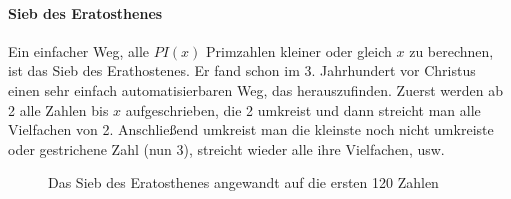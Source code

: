 \begin{refsegment}
\paragraph*{Sieb des Eratosthenes}\mbox{}
\hypertarget{SieveEratosthenes01}{}

Ein einfacher Weg, alle $PI(x)$ Primzahlen kleiner oder gleich $x$
zu berechnen, ist das Sieb des Erathostenes. Er fand schon im 3.
Jahrhundert vor Christus einen sehr einfach automatisierbaren Weg,
das herauszufinden. Zuerst werden ab 2 alle Zahlen bis $x$
aufgeschrieben, die 2 umkreist und dann streicht man alle
Vielfachen von 2. Anschließend umkreist man die kleinste noch
nicht umkreiste oder gestrichene Zahl (nun 3), streicht wieder
alle ihre Vielfachen, usw.

\begin{figure}[!hb]
\begin{center}
 
 \caption[Das Sieb des Eratosthenes angewandt auf die ersten 120 Zahlen]
         {Das Sieb des Eratosthenes angewandt auf die ersten 120 Zahlen\protect\footnotemark}
\label{SieveEratosthenes01-figure}
\end{center}
\end{figure}


\end{refsegment}
